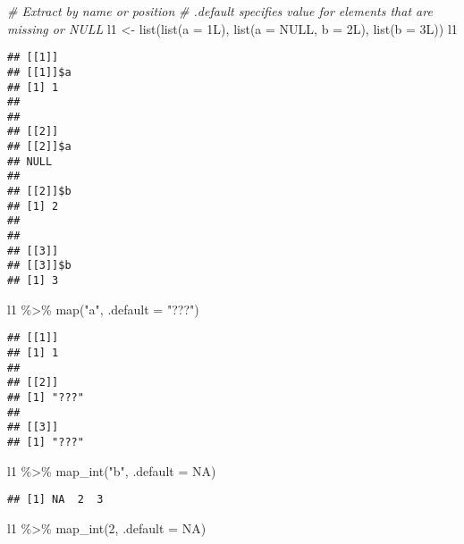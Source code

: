 \documentclass[
]{book}
\newenvironment{Shaded}{\begin{snugshade}}{\end{snugshade}}
\newcommand{\AttributeTok}[1]{\textcolor[rgb]{0.77,0.63,0.00}{#1}}
\newcommand{\CommentTok}[1]{\textcolor[rgb]{0.56,0.35,0.01}{\textit{#1}}}
\newcommand{\ConstantTok}[1]{\textcolor[rgb]{0.00,0.00,0.00}{#1}}
\newcommand{\DecValTok}[1]{\textcolor[rgb]{0.00,0.00,0.81}{#1}}
\newcommand{\FunctionTok}[1]{\textcolor[rgb]{0.00,0.00,0.00}{#1}}
\newcommand{\NormalTok}[1]{#1}
\newcommand{\OtherTok}[1]{\textcolor[rgb]{0.56,0.35,0.01}{#1}}
\newcommand{\SpecialCharTok}[1]{\textcolor[rgb]{0.00,0.00,0.00}{#1}}
\newcommand{\StringTok}[1]{\textcolor[rgb]{0.31,0.60,0.02}{#1}}
\begin{document}
\begin{Shaded}
\begin{Highlighting}[]
\CommentTok{\# Extract by name or position}
\CommentTok{\# .default specifies value for elements that are missing or NULL}
\NormalTok{l1 }\OtherTok{\textless{}{-}} \FunctionTok{list}\NormalTok{(}\FunctionTok{list}\NormalTok{(}\AttributeTok{a =}\NormalTok{ 1L), }
           \FunctionTok{list}\NormalTok{(}\AttributeTok{a =} \ConstantTok{NULL}\NormalTok{, }\AttributeTok{b =}\NormalTok{ 2L), }
           \FunctionTok{list}\NormalTok{(}\AttributeTok{b =}\NormalTok{ 3L))}
\NormalTok{l1}
\end{Highlighting}
\end{Shaded}

\begin{verbatim}
## [[1]]
## [[1]]$a
## [1] 1
## 
## 
## [[2]]
## [[2]]$a
## NULL
## 
## [[2]]$b
## [1] 2
## 
## 
## [[3]]
## [[3]]$b
## [1] 3
\end{verbatim}

\begin{Shaded}
\begin{Highlighting}[]
\NormalTok{l1 }\SpecialCharTok{\%\textgreater{}\%} 
  \FunctionTok{map}\NormalTok{(}\StringTok{"a"}\NormalTok{, }\AttributeTok{.default =} \StringTok{"???"}\NormalTok{)}
\end{Highlighting}
\end{Shaded}

\begin{verbatim}
## [[1]]
## [1] 1
## 
## [[2]]
## [1] "???"
## 
## [[3]]
## [1] "???"
\end{verbatim}

\begin{Shaded}
\begin{Highlighting}[]
\NormalTok{l1 }\SpecialCharTok{\%\textgreater{}\%} 
  \FunctionTok{map\_int}\NormalTok{(}\StringTok{"b"}\NormalTok{, }\AttributeTok{.default =} \ConstantTok{NA}\NormalTok{)}
\end{Highlighting}
\end{Shaded}

\begin{verbatim}
## [1] NA  2  3
\end{verbatim}

\begin{Shaded}
\begin{Highlighting}[]
\NormalTok{l1 }\SpecialCharTok{\%\textgreater{}\%} 
  \FunctionTok{map\_int}\NormalTok{(}\DecValTok{2}\NormalTok{, }\AttributeTok{.default =} \ConstantTok{NA}\NormalTok{)}
\end{Highlighting}
\end{Shaded}
\end{document}

